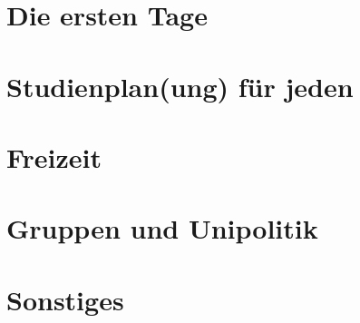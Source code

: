 \documentclass[]{papertex}
\begin{document}
	\thispagestyle{empty}
	\clearpage
	\setcounter{page}{1}
	\tableofcontents
	\newpage
	\newpage
	\section{Die ersten Tage}
		
		
	\newpage
	\section{Studienplan(ung) für jeden}
		\label{studienplan}
	 
	
	\newpage
	\section{Freizeit}
		\label{freizeit}
		
	\newpage
	\section{Gruppen und Unipolitik}
		\label{politik}
		
		
	\newpage
	\section{Sonstiges}
		\label{sonstiges}
		
		
		
		
\end{document}
